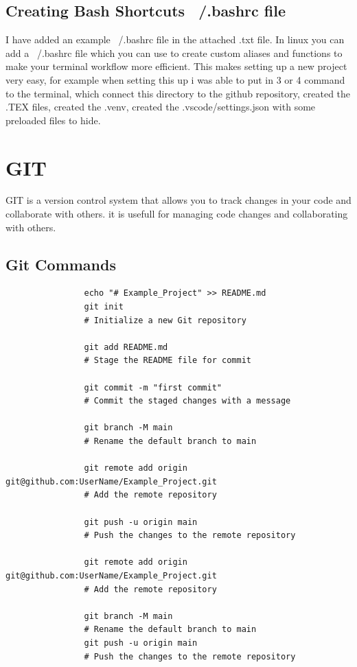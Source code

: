 \documentclass[a4paper,11pt]{article}
\begin{document}
        \subsection{Creating Bash Shortcuts ~/.bashrc file}
        I have added an example ~/.bashrc file in the attached .txt file.
        In linux you can add a ~/.bashrc file which you can use to create custom aliases and functions to make your terminal workflow more efficient.
        This makes setting up a new project very easy, for example when setting this up i was able to put in 3 or 4 command to the
        terminal, which connect this directory to the github repository, created the .TEX files, created the .venv, created the 
        .vscode/settings.json with some preloaded files to hide.



    \section{GIT}

        GIT is a version control system that allows you to track changes in your code and collaborate with others.
        it is usefull for managing code changes and collaborating with others.

        \subsection{Git Commands}

            \begin{verbatim}
                echo "# Example_Project" >> README.md
                git init                        
                # Initialize a new Git repository
                
                git add README.md               
                # Stage the README file for commit

                git commit -m "first commit"    
                # Commit the staged changes with a message

                git branch -M main              
                # Rename the default branch to main

                git remote add origin git@github.com:UserName/Example_Project.git 
                # Add the remote repository
                
                git push -u origin main         
                # Push the changes to the remote repository

                git remote add origin git@github.com:UserName/Example_Project.git 
                # Add the remote repository
                
                git branch -M main              
                # Rename the default branch to main
                git push -u origin main         
                # Push the changes to the remote repository
            \end{verbatim}
\end{document}
